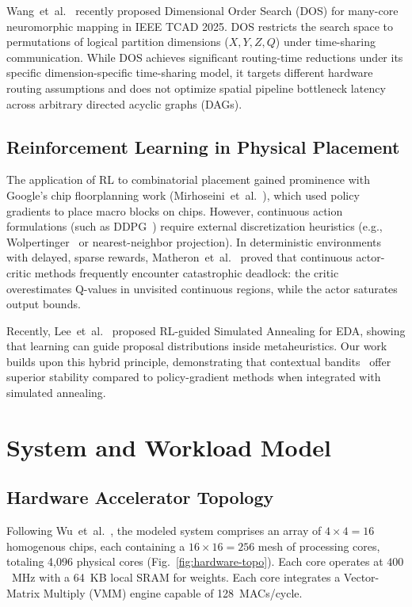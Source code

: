 \documentclass[10pt,conference]{IEEEtran}
\begin{document}
Wang~et~al.~\cite{wang2025dos} recently proposed Dimensional Order Search (DOS) for many-core neuromorphic mapping in IEEE TCAD 2025. DOS restricts the search space to permutations of logical partition dimensions ($X, Y, Z, Q$) under time-sharing communication. While DOS achieves significant routing-time reductions under its specific dimension-specific time-sharing model, it targets different hardware routing assumptions and does not optimize spatial pipeline bottleneck latency across arbitrary directed acyclic graphs (DAGs).

\subsection{Reinforcement Learning in Physical Placement}
The application of RL to combinatorial placement gained prominence with Google's chip floorplanning work (Mirhoseini~et~al.~\cite{mirhoseini2021graphplacement}), which used policy gradients to place macro blocks on chips. However, continuous action formulations (such as DDPG~\cite{lillicrap2016ddpg}) require external discretization heuristics (e.g., Wolpertinger~\cite{dulac2015wolpertinger} or nearest-neighbor projection). In deterministic environments with delayed, sparse rewards, Matheron~et~al.~\cite{matheron2019ddpg} proved that continuous actor-critic methods frequently encounter catastrophic deadlock: the critic overestimates Q-values in unvisited continuous regions, while the actor saturates output bounds. 

Recently, Lee~et~al.~\cite{rl_based_sa_2025} proposed RL-guided Simulated Annealing for EDA, showing that learning can guide proposal distributions inside metaheuristics. Our work builds upon this hybrid principle, demonstrating that contextual bandits~\cite{lattimore2020bandit} offer superior stability compared to policy-gradient methods when integrated with simulated annealing.

\section{System and Workload Model}
\label{sec:system}

\subsection{Hardware Accelerator Topology}
Following Wu~et~al.~\cite{wu2020todaes}, the modeled system comprises an array of $4 \times 4 = 16$ homogenous chips, each containing a $16 \times 16 = 256$ mesh of processing cores, totaling 4,096 physical cores (Fig.~\ref{fig:hardware-topo}). Each core operates at $400$~MHz with a 64~KB local SRAM for weights. Each core integrates a Vector-Matrix Multiply (VMM) engine capable of 128~MACs/cycle.
\end{document}
